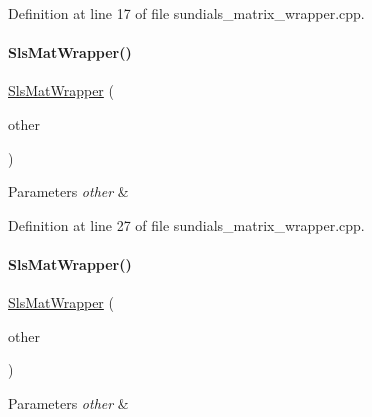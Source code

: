Definition at line 17 of file sundials\+\_\+matrix\+\_\+wrapper.\+cpp.

\mbox{\label{classamici_1_1_sls_mat_wrapper_a1a64ce4c1978dcf11d5649f810abd6af}} 
\paragraph{\texorpdfstring{SlsMatWrapper()}{SlsMatWrapper()}\hspace{0.1cm}{\footnotesize\ttfamily [3/4]}}
{\footnotesize\ttfamily \mbox{\hyperlink{classamici_1_1_sls_mat_wrapper}{Sls\+Mat\+Wrapper}} (\begin{DoxyParamCaption}\item[{const \mbox{\hyperlink{classamici_1_1_sls_mat_wrapper}{Sls\+Mat\+Wrapper}} \&}]{other }\end{DoxyParamCaption})}


\begin{DoxyParams}{Parameters}
{\em other} & \\
\hline
\end{DoxyParams}


Definition at line 27 of file sundials\+\_\+matrix\+\_\+wrapper.\+cpp.

\mbox{\label{classamici_1_1_sls_mat_wrapper_a724145bbf0b9e6aa66a81d8766874fcf}} 
\paragraph{\texorpdfstring{SlsMatWrapper()}{SlsMatWrapper()}\hspace{0.1cm}{\footnotesize\ttfamily [4/4]}}
{\footnotesize\ttfamily \mbox{\hyperlink{classamici_1_1_sls_mat_wrapper}{Sls\+Mat\+Wrapper}} (\begin{DoxyParamCaption}\item[{\mbox{\hyperlink{classamici_1_1_sls_mat_wrapper}{Sls\+Mat\+Wrapper}} \&\&}]{other }\end{DoxyParamCaption})\hspace{0.3cm}{\ttfamily [noexcept]}}


\begin{DoxyParams}{Parameters}
{\em other} & \\
\hline
\end{DoxyParams}


